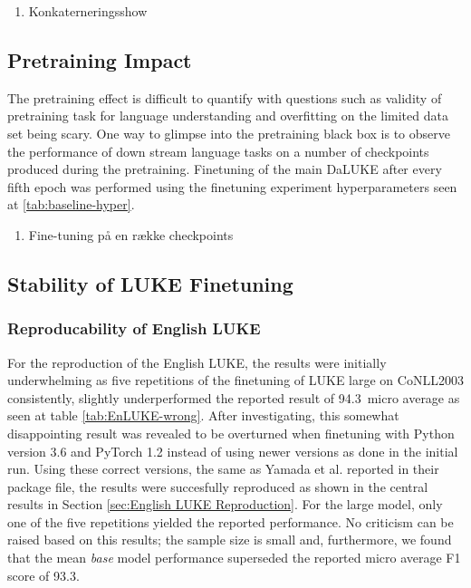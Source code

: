 \documentclass[main.tex]{subfiles}
\begin{document}
\begin{enumerate}
    \item Konkaterneringsshow
\end{enumerate}


\subsection{Pretraining Impact}
The pretraining effect is difficult to quantify with questions such as validity of pretraining task for language understanding and overfitting on the limited data set being scary.
One way to glimpse into the pretraining black box is to observe the performance of down stream language tasks on a number of checkpoints produced during the pretraining.
Finetuning of the main DaLUKE after every fifth epoch was performed using the finetuning experiment hyperparameters seen at \ref{tab:baseline-hyper}.

\begin{enumerate}
    \item Fine-tuning på en række checkpoints
\end{enumerate}


\subsection{Stability of LUKE Finetuning}

\subsubsection{Reproducability of English LUKE}
For the reproduction of the English LUKE, the results were initially underwhelming as five repetitions of the finetuning of LUKE large on CoNLL2003 consistently, slightly underperformed the reported result of 94.3\pro\ micro average as seen at table \ref{tab:EnLUKE-wrong}.
After investigating, this somewhat disappointing result was revealed to be overturned when finetuning with Python version 3.6 and PyTorch 1.2 instead of using newer versions as done in the initial run.
Using these correct versions, the same as Yamada et al. reported in their package file, the results were succesfully reproduced as shown in the central results in Section \ref{sec:English LUKE Reproduction}.
For the large model, only one of the five repetitions yielded the reported performance.
No criticism can be raised based on this results; the sample size is small and, furthermore, we found that the mean \emph{base} model performance superseded the reported micro average F1 score of 93.3\pro.
\end{document}
